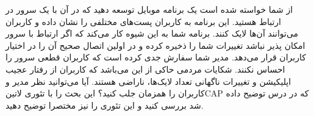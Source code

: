 
از شما خواسته شده است یک برنامه موبایل توسعه دهید که در آن با یک سرور در ارتباط هستید. این برنامه به کاربران پست‌های مختلفی را نشان داده و کاربران می‌توانند آن‌ها لایک کنند.
برنامه شما به این شیوه کار می‌کند که اگر ارتباط با سرور امکان پذیر نباشد تغییرات شما را ذخیره کرده و در اولین اتصال صحیح آن را در اختیار کاربران قرار می‌دهد.
مدیر شما سفارش جدی کرده است که کاربران قطعی سرور را احساس نکنند.
شکایات مردمی حاکی از این می‌باشد که کاربران از رفتار عجیب اپلیکیشن و تغییرات ناگهانی تعداد لایک‌ها، ناراضی هستند.
آیا می‌توانید نظر مدیر و کاربران را همزمان جلب کنید؟ این بحث را با تئوری ‌لاتین{CAP} که در درس توضیح داده شد بررسی کنید و این تئوری را نیز مختصرا توضیح دهید.

